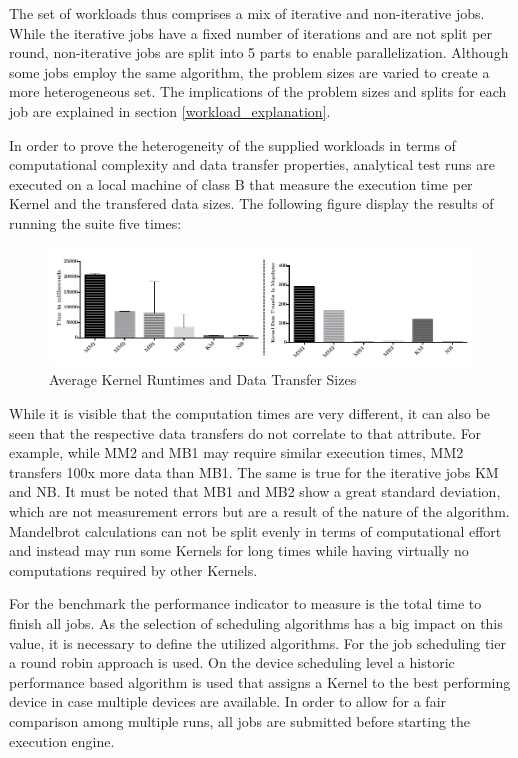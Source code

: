 The set of workloads thus comprises a mix of iterative and non-iterative jobs. While the iterative jobs have a fixed number of iterations and are not split per round, non-iterative jobs are split into 5 parts to enable parallelization. Although some jobs employ the same algorithm, the problem sizes are varied to create a more heterogeneous set. The implications of the problem sizes and splits for each job are explained in section \ref{workload_explanation}.

In order to prove the heterogeneity of the supplied workloads in terms of computational complexity and data transfer properties, analytical test runs are executed on a local machine of class B that measure the execution time per Kernel and the transfered data sizes. The following figure display the results of running the suite five times:

\begin{figure}[H]
	
	\includegraphics[width=1.0\textwidth]{images/benchmark_kernel_data_transfers.pdf}
	\centering
	\caption{Average Kernel Runtimes and Data Transfer Sizes}
	\label{img:benchmark_kernel_attributes}
\end{figure}

While it is visible that the computation times are very different, it can also be seen that the respective data transfers do not correlate to that attribute. For example, while MM2 and MB1 may require similar execution times, MM2 transfers 100x more data than MB1. The same is true for the iterative jobs KM and NB. It must be noted that MB1 and MB2 show a great standard deviation, which are not measurement errors but are a result of the nature of the algorithm. Mandelbrot calculations can not be split evenly in terms of computational effort and instead may run some Kernels for long times while having virtually no computations required by other Kernels.

For the benchmark the performance indicator to measure is the total time to finish all jobs. As the selection of scheduling algorithms has a big impact on this value, it is necessary to define the utilized algorithms. For the job scheduling tier a round robin approach is used. On the device scheduling level a historic performance based algorithm is used that assigns a Kernel to the best performing device in case multiple devices are available. In order to allow for a fair comparison among multiple runs, all jobs are submitted before starting the execution engine.

